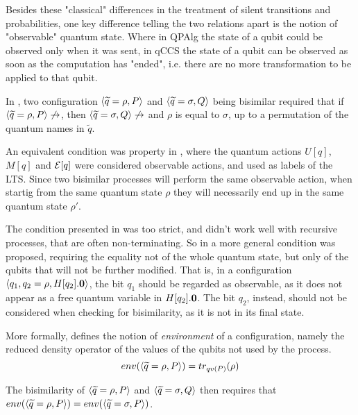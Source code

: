 Besides these "classical" differences in the treatment of silent transitions and probabilities, one key difference telling the two relations apart is the notion of "observable" quantum state. Where in QPAlg the state of a qubit could be observed only when it was sent, in qCCS the state of a qubit can be observed as soon as the computation has "ended", i.e. there are no more transformation to be applied to that qubit.

In  \cite{fengProbabilisticBisimulationsQuantum2007}, two configuration $\langle\widetilde{q} = \rho, P\rangle$ and $\langle\widetilde{q} = \sigma, Q\rangle$ being bisimilar required that if $\langle\widetilde{q} = \rho, P\rangle \not\rightarrow$, then $\langle\widetilde{q} = \sigma, Q\rangle \not\rightarrow$ and $\rho$ is equal to $\sigma$, up to a permutation of the quantum names in $\widetilde{q}$. 

An equivalent condition was property in \cite{yingAlgebraQuantumProcesses2010}, where the quantum actions $U[q]$, $M[q]$ and $\mathcal{E}[q]$ were considered observable actions, and used as labels of the LTS. Since two bisimilar processes will perform the same observable action, when startig from the same quantum state $\rho$ they will necessarily end up in the same quantum state $\rho'$.

The condition presented in \cite{fengProbabilisticBisimulationsQuantum2007} was too strict, and didn't work well with recursive processes, that are often non-terminating. So in \cite{fengBisimulationQuantumProcesses2012} a more general condition was proposed, requiring the equality not of the whole quantum state, but only of the qubits that will not be further modified. That is, in a configuration $\langle q_1, q_2 = \rho, H[q_2].\mathbf{0}\rangle$, the bit $q_1$ should be regarded as observable, as it does not appear as a free quantum variable in $H[q_2].\mathbf{0}$. The bit $q_2$, instead, should not be considered when checking for bisimilarity, as it is not in its final state.

More formally, \cite{fengBisimulationQuantumProcesses2012} defines the notion of \textit{environment} of a configuration, namely the reduced density operator of the values of the qubits not used by the process.
\[env(\langle\widetilde{q} = \rho, P\rangle) = tr_{qv(P)}(\rho)\]


The bisimilarity of $\langle\widetilde{q} = \rho, P\rangle $ and $\langle\widetilde{q} = 	\sigma, Q\rangle$ then requires that 
$env(\langle\widetilde{q} = \rho, P\rangle) = env(\langle\widetilde{q} = \sigma, P\rangle)$.



